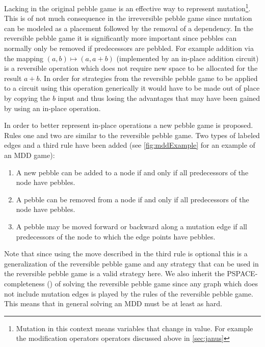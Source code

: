 Lacking in the original pebble game is an effective way to represent
mutation\footnote{Mutation in this context means variables that change in
value. For example the modification operators operators discussed above in
\cref{sec:janus}}. This is of not much consequence in the irreversible pebble
game since mutation can be modeled as a placement followed by the removal of a
dependency. In the reversible pebble game it is significantly more important
since pebbles can normally only be removed if predecessors are pebbled. For
example addition via the mapping $(a,b) \mapsto (a,a+b)$ (implemented by an
in-place addition circuit) is a reversible operation which does not require new
space to be allocated for the result $a+b$.  In order for strategies from the
reversible pebble game to be applied to a circuit using this operation
generically it would have to be made out of place by copying the $b$ input and
thus losing the advantages that may have been gained by using an in-place
operation.

In order to better represent in-place operations a new pebble game is proposed.
Rules one and two are similar to the reversible pebble game. Two types of labeled edges and a third rule
have been added (see \cref{fig:mddExample} for an example of an MDD game):


\begin{enumerate}

   \item A new pebble can be added to a node if and only if all predecessors of
     the node have pebbles.

   \item A pebble can be removed from a node if and only if all predecessors of
     the node have pebbles.

   \item A pebble may be moved forward or backward along a mutation edge if all
     predecessors of the node to which the edge points have pebbles.

\end{enumerate}

Note that since using the move described in the third rule is optional this is
a generalization of the reversible pebble game and any strategy that can be
used in the reversible pebble game is a valid strategy here. We also inherit
the PSPACE-completeness (\cite{chan13}) of solving the reversible pebble game
since any graph which does not include mutation edges is played by the rules of
the reversible pebble game. This means that in general solving an MDD must be
at least as hard.

